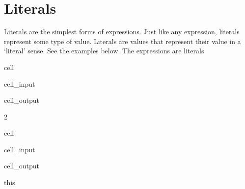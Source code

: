 \documentclass[letterpaper,10pt,english]{jupyterBook}
\begin{document}
\section{Literals}
\label{\detokenize{expressions:literals}}
\sphinxAtStartPar
Literals are the simplest forms of expressions. Just like any expression, literals represent some type of value. Literals are values that represent their value in a ‘literal’ sense. See the examples below. The expressions are literals

\begin{sphinxuseclass}{cell}\begin{sphinxVerbatimInput}

\begin{sphinxuseclass}{cell_input}
\begin{sphinxVerbatim}[commandchars=\\\{\}]
\end{sphinxVerbatim}

\end{sphinxuseclass}\end{sphinxVerbatimInput}
\begin{sphinxVerbatimOutput}

\begin{sphinxuseclass}{cell_output}
\begin{sphinxVerbatim}[commandchars=\\\{\}]
2
\end{sphinxVerbatim}

\end{sphinxuseclass}\end{sphinxVerbatimOutput}

\end{sphinxuseclass}
\begin{sphinxuseclass}{cell}\begin{sphinxVerbatimInput}

\begin{sphinxuseclass}{cell_input}
\begin{sphinxVerbatim}[commandchars=\\\{\}]
\end{sphinxVerbatim}

\end{sphinxuseclass}\end{sphinxVerbatimInput}
\begin{sphinxVerbatimOutput}

\begin{sphinxuseclass}{cell_output}
\begin{sphinxVerbatim}[commandchars=\\\{\}]
\PYGZsq{}this\PYGZsq{}
\end{sphinxVerbatim}

\end{sphinxuseclass}\end{sphinxVerbatimOutput}

\end{sphinxuseclass}
\end{document}

